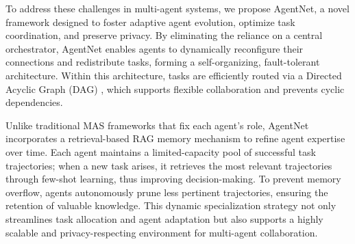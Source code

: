 \documentclass{article}
\begin{document}
To address these challenges in multi-agent systems, we propose AgentNet, a novel framework designed to foster adaptive agent evolution, optimize task coordination, and preserve privacy. By eliminating the reliance on a central orchestrator, AgentNet enables agents to dynamically reconfigure their connections and redistribute tasks, forming a self-organizing, fault-tolerant architecture. Within this architecture, tasks are efficiently routed via a Directed Acyclic Graph (DAG) \citep{kahn1962topological,ahuja1993network}, which supports flexible collaboration and prevents cyclic dependencies.

Unlike traditional MAS frameworks that fix each agent’s role, AgentNet incorporates a retrieval-based RAG \citep{lewis2020retrieval,gao2023retrieval, zhou2024tradenhancingllmagents} memory mechanism to refine agent expertise over time. Each agent maintains a limited-capacity pool of successful task trajectories; when a new task arises, it retrieves the most relevant trajectories through few-shot learning, thus improving decision-making. To prevent memory overflow, agents autonomously prune less pertinent trajectories, ensuring the retention of valuable knowledge. This dynamic specialization strategy not only streamlines task allocation and agent adaptation but also supports a highly scalable and privacy-respecting environment for multi-agent collaboration.
\end{document}
